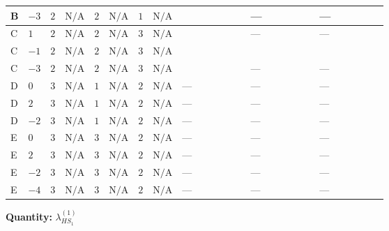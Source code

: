 \documentclass[8pt]{article}
\begin{document}
\begin{landscape}
\begin{longtable}{@{}llcccccc >{\raggedright\arraybackslash}p{0.21\linewidth} >{\raggedright\arraybackslash}p{0.21\linewidth} >{\raggedright\arraybackslash}p{0.21\linewidth}@{}}
\midrule
B & $-3$ & $2$ & $\text{N/A}$ & $2$ & $\text{N/A}$ & $1$ & $\text{N/A}$ & \scriptsize\adjustbox{max width=\linewidth}{$\begin{gathered} +\frac{3 {\lambda_{HS_1}^{(A)}}^2}{4}\end{gathered}$} & --- & --- \\
\midrule
C & $1$ & $2$ & $\text{N/A}$ & $2$ & $\text{N/A}$ & $3$ & $\text{N/A}$ & \scriptsize\adjustbox{max width=\linewidth}{$\begin{gathered} +\frac{3 {\lambda_{HS_1}^{(A)}}^2}{4}\end{gathered}$} & --- & --- \\
\midrule
C & $-1$ & $2$ & $\text{N/A}$ & $2$ & $\text{N/A}$ & $3$ & $\text{N/A}$ & \scriptsize\adjustbox{max width=\linewidth}{$\begin{gathered} +\frac{3 {\lambda_{HS_1}^{(A)}}^2}{4}\end{gathered}$} & \scriptsize\adjustbox{max width=\linewidth}{$\begin{gathered} +24 {\lambda_{7}} \left({\lambda_{7}}\right)^{*}\end{gathered}$} & \scriptsize\adjustbox{max width=\linewidth}{$\begin{gathered} +3 {\lambda_{11}} (\left({\lambda_{H H^\dagger S_1^\dagger S_2^\dagger}^{\rm Cross}}\right)^{*}-\left({\lambda_{X_{17}}^{(1)}}\right)^{*})\end{gathered}$} \\
\midrule
C & $-3$ & $2$ & $\text{N/A}$ & $2$ & $\text{N/A}$ & $3$ & $\text{N/A}$ & \scriptsize\adjustbox{max width=\linewidth}{$\begin{gathered} +\frac{3 {\lambda_{HS_1}^{(A)}}^2}{4}\end{gathered}$} & --- & --- \\
\midrule
D & $0$ & $3$ & $\text{N/A}$ & $1$ & $\text{N/A}$ & $2$ & $\text{N/A}$ & --- & --- & --- \\
\midrule
D & $2$ & $3$ & $\text{N/A}$ & $1$ & $\text{N/A}$ & $2$ & $\text{N/A}$ & --- & --- & --- \\
\midrule
D & $-2$ & $3$ & $\text{N/A}$ & $1$ & $\text{N/A}$ & $2$ & $\text{N/A}$ & --- & --- & --- \\
\midrule
E & $0$ & $3$ & $\text{N/A}$ & $3$ & $\text{N/A}$ & $2$ & $\text{N/A}$ & --- & --- & --- \\
\midrule
E & $2$ & $3$ & $\text{N/A}$ & $3$ & $\text{N/A}$ & $2$ & $\text{N/A}$ & --- & --- & --- \\
\midrule
E & $-2$ & $3$ & $\text{N/A}$ & $3$ & $\text{N/A}$ & $2$ & $\text{N/A}$ & --- & --- & --- \\
\midrule
E & $-4$ & $3$ & $\text{N/A}$ & $3$ & $\text{N/A}$ & $2$ & $\text{N/A}$ & --- & --- & --- \\
\midrule
\bottomrule
\end{longtable}
\clearpage
\noindent\textbf{Quantity: }$\lambda_{HS_1}^{(1)}$\par\smallskip

\end{landscape}
\end{document}

